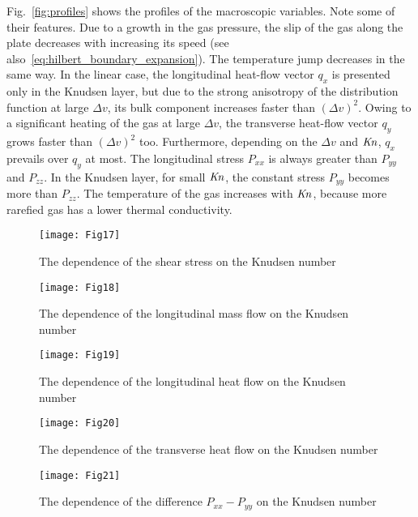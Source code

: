 \documentclass[]{jfm}
\newcommand{\Kn}{\mbox{\textit{Kn}}}
\begin{document}
Fig.~\ref{fig:profiles} shows the profiles of the macroscopic variables.
Note some of their features.
Due to a growth in the gas pressure, the slip of the gas along the plate decreases
with increasing its speed (see also~\eqref{eq:hilbert_boundary_expansion}).
The temperature jump decreases in the same way.
In the linear case, the longitudinal heat-flow vector \(q_x\) is presented only in the Knudsen layer,
but due to the strong anisotropy of the distribution function at large \(\Delta{v}\),
its bulk component increases faster than \((\Delta{v})^2\).
Owing to a significant heating of the gas at large \(\Delta{v}\),
the transverse heat-flow vector \(q_y\) grows faster than \((\Delta{v})^2\) too.
Furthermore, depending on the \(\Delta{v}\) and \(\Kn\), \(q_x\) prevails over \(q_y\) at most.
The longitudinal stress \(P_{xx}\) is always greater than \(P_{yy}\) and \(P_{zz}\).
In the Knudsen layer, for small \(\Kn\), the constant stress \(P_{yy}\) becomes more than \(P_{zz}\).
The temperature of the gas increases with \(\Kn\), because more rarefied gas
has a lower thermal conductivity.

\begin{figure}
    \centering
    \texttt{[image: Fig17]}
    \caption{The dependence of the shear stress on the Knudsen number}
    \label{fig:shear}
\end{figure}

\begin{figure}
    \centering
    \texttt{[image: Fig18]}
    \caption{The dependence of the longitudinal mass flow on the Knudsen number}
    \label{fig:flow}
\end{figure}

\begin{figure}
    \centering
    \texttt{[image: Fig19]}
    \caption{The dependence of the longitudinal heat flow on the Knudsen number}
    \label{fig:qflow}
\end{figure}

\begin{figure}
    \centering
    \texttt{[image: Fig20]}
    \caption{The dependence of the transverse heat flow on the Knudsen number}
    \label{fig:qflowy}
\end{figure}

\begin{figure}
    \centering
    \texttt{[image: Fig21]}
    \caption{The dependence of the difference \(P_{xx}-P_{yy}\) on the Knudsen number}
    \label{fig:pxx}
\end{figure}
\end{document}
